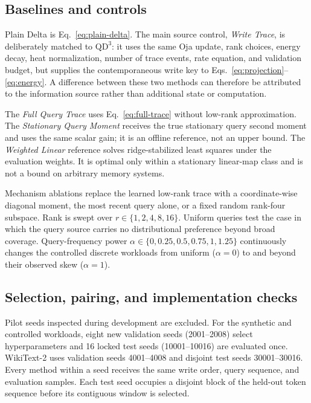 \documentclass[pdflatex,sn-mathphys-num]{sn-jnl}
\theoremstyle{thmstyleone}
\newcommand{\QDDD}{\ensuremath{\mathrm{QD}^{3}}}
\begin{document}
\subsection{Baselines and controls}

Plain Delta is Eq.~\eqref{eq:plain-delta}. The main source control, \emph{Write Trace}, is deliberately matched to \QDDD: it uses the same Oja update, rank choices, energy decay, heat normalization, number of trace events, rate equation, and validation budget, but supplies the contemporaneous write key to Eqs.~\eqref{eq:projection}--\eqref{eq:energy}. A difference between these two methods can therefore be attributed to the information source rather than additional state or computation.

The \emph{Full Query Trace} uses Eq.~\eqref{eq:full-trace} without low-rank approximation. The \emph{Stationary Query Moment} receives the true stationary query second moment and uses the same scalar gain; it is an offline reference, not an upper bound. The \emph{Weighted Linear} reference solves ridge-stabilized least squares under the evaluation weights. It is optimal only within a stationary linear-map class and is not a bound on arbitrary memory systems.

Mechanism ablations replace the learned low-rank trace with a coordinate-wise diagonal moment, the most recent query alone, or a fixed random rank-four subspace. Rank is swept over $r\in\{1,2,4,8,16\}$. Uniform queries test the case in which the query source carries no distributional preference beyond broad coverage. Query-frequency power $\alpha\in\{0,0.25,0.5,0.75,1,1.25\}$ continuously changes the controlled discrete workloads from uniform ($\alpha=0$) to and beyond their observed skew ($\alpha=1$).

\subsection{Selection, pairing, and implementation checks}

Pilot seeds inspected during development are excluded. For the synthetic and controlled workloads, eight new validation seeds (2001--2008) select hyperparameters and 16 locked test seeds (10001--10016) are evaluated once. WikiText-2 uses validation seeds 4001--4008 and disjoint test seeds 30001--30016. Every method within a seed receives the same write order, query sequence, and evaluation samples. Each test seed occupies a disjoint block of the held-out token sequence before its contiguous window is selected.
\end{document}
